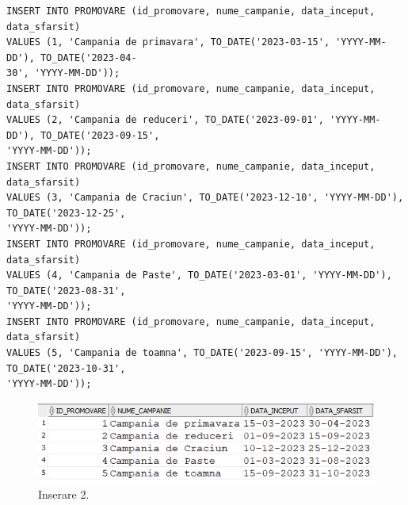 \begin{itemize}
\begin{lstlisting}
INSERT INTO PROMOVARE (id_promovare, nume_campanie, data_inceput, data_sfarsit)
VALUES (1, 'Campania de primavara', TO_DATE('2023-03-15', 'YYYY-MM-DD'), TO_DATE('2023-04-
30', 'YYYY-MM-DD'));
INSERT INTO PROMOVARE (id_promovare, nume_campanie, data_inceput, data_sfarsit)
VALUES (2, 'Campania de reduceri', TO_DATE('2023-09-01', 'YYYY-MM-DD'), TO_DATE('2023-09-15',
'YYYY-MM-DD'));
INSERT INTO PROMOVARE (id_promovare, nume_campanie, data_inceput, data_sfarsit)
VALUES (3, 'Campania de Craciun', TO_DATE('2023-12-10', 'YYYY-MM-DD'), TO_DATE('2023-12-25',
'YYYY-MM-DD'));
INSERT INTO PROMOVARE (id_promovare, nume_campanie, data_inceput, data_sfarsit)
VALUES (4, 'Campania de Paste', TO_DATE('2023-03-01', 'YYYY-MM-DD'), TO_DATE('2023-08-31',
'YYYY-MM-DD'));
INSERT INTO PROMOVARE (id_promovare, nume_campanie, data_inceput, data_sfarsit)
VALUES (5, 'Campania de toamna', TO_DATE('2023-09-15', 'YYYY-MM-DD'), TO_DATE('2023-10-31',
'YYYY-MM-DD'));
    \end{lstlisting} 
    \vspace{0.2cm}
    \begin{figure}[h]
      \centerline{\includegraphics{images/inserare2.png}}
      \caption{ Inserare 2.}
    \end{figure}
    \vspace{0.5cm}


\end{itemize}
